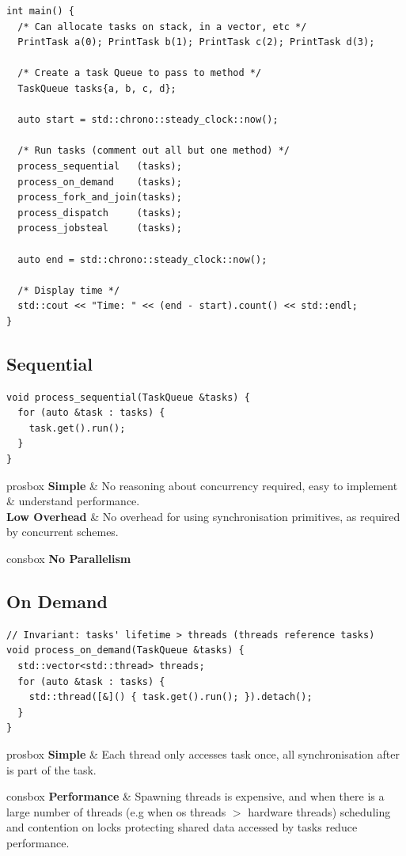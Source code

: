 \begin{verbatim}
int main() {
  /* Can allocate tasks on stack, in a vector, etc */
  PrintTask a(0); PrintTask b(1); PrintTask c(2); PrintTask d(3);

  /* Create a task Queue to pass to method */
  TaskQueue tasks{a, b, c, d};

  auto start = std::chrono::steady_clock::now();

  /* Run tasks (comment out all but one method) */
  process_sequential   (tasks);
  process_on_demand    (tasks);
  process_fork_and_join(tasks);
  process_dispatch     (tasks);
  process_jobsteal     (tasks);

  auto end = std::chrono::steady_clock::now();
  
  /* Display time */
  std::cout << "Time: " << (end - start).count() << std::endl;
}
\end{verbatim}
\subsection{Sequential}
\begin{verbatim}
void process_sequential(TaskQueue &tasks) {
  for (auto &task : tasks) {
    task.get().run();
  }
}   
\end{verbatim}
\begin{tabbox}{prosbox}
    \textbf{Simple} & No reasoning about concurrency required, easy to implement \& understand performance. \\
    \textbf{Low Overhead} & No overhead for using synchronisation primitives, as required by concurrent schemes. \\
\end{tabbox}
\begin{tabbox}{consbox}
    \textbf{No Parallelism}
\end{tabbox}

\subsection{On Demand}
\begin{verbatim}
// Invariant: tasks' lifetime > threads (threads reference tasks)
void process_on_demand(TaskQueue &tasks) {
  std::vector<std::thread> threads;
  for (auto &task : tasks) {
    std::thread([&]() { task.get().run(); }).detach();
  }
}
\end{verbatim}
\begin{tabbox}{prosbox}
    \textbf{Simple} & Each thread only accesses task once, all synchronisation after is part of the task. \\
\end{tabbox}
\begin{tabbox}{consbox}
    \textbf{Performance} & Spawning threads is expensive, and when there is a large number of threads (e.g when os threads $>$ hardware threads) scheduling and contention on locks protecting shared data accessed by tasks reduce performance. \\
\end{tabbox}

